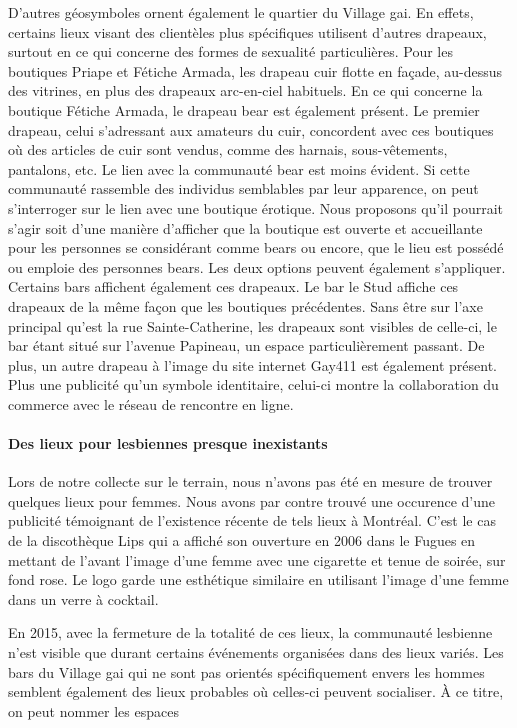D'autres géosymboles \lgbt{} ornent également le quartier du Village gai.
En effets, certains lieux visant des clientèles plus spécifiques utilisent d'autres drapeaux, surtout en ce qui concerne des formes de sexualité particulières.
Pour les boutiques Priape et Fétiche Armada, les drapeau cuir flotte en façade, au-dessus des vitrines, en plus des drapeaux arc-en-ciel habituels.
En ce qui concerne la boutique Fétiche Armada, le drapeau bear est également présent.
Le premier drapeau, celui s'adressant aux amateurs du cuir, concordent avec ces boutiques où des articles de cuir sont vendus, comme des harnais, sous-vêtements, pantalons, etc.
Le lien avec la communauté bear est moins évident.
Si cette communauté rassemble des individus semblables par leur apparence, on peut s'interroger sur le lien avec une boutique érotique.
Nous proposons qu'il pourrait s'agir soit d'une manière d'afficher que la boutique est ouverte et accueillante pour les personnes se considérant comme bears ou encore, que le lieu est possédé ou emploie des personnes bears.
Les deux options peuvent également s'appliquer.
Certains bars affichent également ces drapeaux.
Le bar le Stud affiche ces drapeaux de la même façon que les boutiques précédentes.
Sans être sur l'axe principal qu'est la rue Sainte-Catherine, les drapeaux sont visibles de celle-ci, le bar étant situé sur l'avenue Papineau, un espace particulièrement passant.
De plus, un autre drapeau à l'image du site internet Gay411 est également présent.
Plus une publicité qu'un symbole identitaire, celui-ci montre la collaboration du commerce avec le réseau de rencontre en ligne.

\paragraph{Des lieux pour lesbiennes presque inexistants}
Lors de notre collecte sur le terrain, nous n'avons pas été en mesure de trouver quelques lieux pour femmes.
Nous avons par contre trouvé une occurence d'une publicité témoignant de l'existence récente de tels lieux à Montréal.
C'est le cas de la discothèque Lips qui a affiché son ouverture en 2006 dans le Fugues en mettant de l'avant l'image d'une femme avec une cigarette et tenue de soirée, sur fond rose.
Le logo garde une esthétique similaire en utilisant l'image d'une femme dans un verre à cocktail.

En 2015, avec la fermeture de la totalité de ces lieux, la communauté lesbienne n'est visible que durant certains événements organisées dans des lieux variés.
Les bars du Village gai qui ne sont pas orientés spécifiquement envers les hommes semblent également des lieux probables où celles-ci peuvent socialiser.
À ce titre, on peut nommer les espaces

